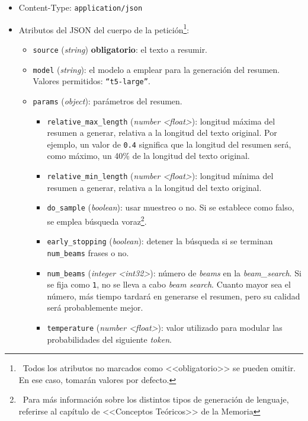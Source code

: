 \vspace{-0.3cm}
\begin{itemize} [\textbullet]
	\item Content-Type: \texttt{application/json}
	\item Atributos del JSON del cuerpo de la petición\footnote{\, Todos los atributos no marcados como <<obligatorio>> se pueden omitir. En ese caso, tomarán valores por defecto.}:
	\begin{itemize} [◦]
		\item \texttt{source} (\emph{string}) \textbf{obligatorio}: el texto a resumir.
		\item \texttt{model} (\emph{string}): el modelo a emplear para la generación del resumen. Valores permitidos: \texttt{``t5-large''}.
		\item \texttt{params} (\emph{object}): parámetros del resumen.
		\begin{itemize} [-]
			\item \texttt{relative\_max\_length} (\emph{number <float>}): longitud máxima del resumen a generar, relativa a la longitud del texto original. Por ejemplo, un valor de \texttt{0.4} significa que la longitud del resumen será, como máximo, un 40\% de la longitud del texto original.
			
			\item \texttt{relative\_min\_length} (\emph{number <float>}): longitud mínima del resumen a generar, relativa a la longitud del texto original.
			
			\item \texttt{do\_sample} (\emph{boolean}): usar muestreo o no. Si se establece como falso, se emplea búsqueda voraz\footnote{\, Para más información sobre los distintos tipos de generación de lenguaje, referirse al capítulo de <<Conceptos Teóricos>> de la Memoria}.
			
			\item \texttt{early\_stopping} (\emph{boolean}): detener la búsqueda si se terminan \texttt{num\_beams} frases o no.
			
			\item \texttt{num\_beams} (\emph{integer <int32>}): número de \emph{beams} en la \emph{beam\_search}. Si se fija como \texttt{1}, no se lleva a cabo \emph{beam search}. Cuanto mayor sea el número, más tiempo tardará en generarse el resumen, pero su calidad será probablemente mejor.
			
			\item \texttt{temperature} (\emph{number <float>}): valor utilizado para modular las probabilidades del siguiente \emph{token}.
			

\end{itemize}
\end{itemize}
\end{itemize}
